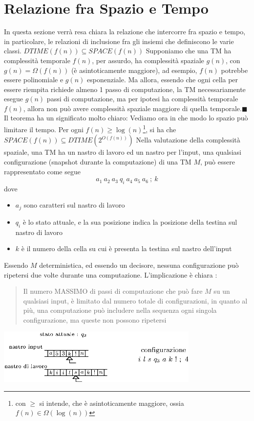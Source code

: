 \documentclass[10pt, letterpaper]{report}
\begin{document}
\section{Relazione fra Spazio e Tempo}
In questa sezione verrà resa chiara la relazione che intercorre fra spazio e tempo, in particolare, le relazioni di inclusione fra gli insiemi che definiscono le varie classi.  \acc 
\teo{} $DTIME(f(n))\subseteq SPACE(f(n))$\acc 
\dimo{} Supponiamo che una TM ha complessità temporale $f(n)$, per assurdo, ha complessità spaziale $g(n)$, con $g(n)=\Omega(f(n))$ (è asintoticamente maggiore), ad esempio, $f(n)$ potrebbe essere polinomiale e $g(n)$ esponenziale.  \acc 
Ma allora, essendo che ogni cella per essere riempita richiede almeno 1 passo di computazione, la TM necessariamente esegue $g(n)$ passi di computazione, ma per ipotesi ha complessità temporale $f(n)$, allora non può avere complessità spaziale maggiore di quella temporale.\hfill$\blacksquare$\acc   
Il  teorema ha un significato molto chiaro:
Vediamo ora in che modo lo spazio può limitare il tempo. \acc
\teo{} Per ogni $f(n)\ge \log(n)$\footnote{con $\ge$ si intende, che è asintoticamente maggiore, ossia $f(n)\in\Omega(\log(n))$}, si ha che $SPACE(f(n))\subseteq DTIME(2^{O(f(n))})$\acc 
\dimo{} Nella valutazione della complessità spaziale, una TM ha un nastro di lavoro ed un nastro per l'input, una qualsiasi configurazione (snapshot durante la computazione) di una TM $M$, può essere rappresentato come segue 
$$ a_1 \ a_2 \ a_3 \ q_i \ a_4 \ a_5 \ a_6 \ ;\ k$$
dove \begin{itemize}
    \item $a_j$ sono caratteri sul nastro di lavoro 
    \item $q_i$ è lo stato attuale, e la sua posizione indica la posizione della testina sul nastro di lavoro 
    \item $k$ è il numero della cella su cui è presenta la testina sul nastro dell'input
\end{itemize}
Essendo $M$ deterministica, ed essendo un decisore, nessuna configurazione può ripetersi due volte durante una computazione. L'implicazione è chiara :\begin{quote}
    Il numero MASSIMO di passi di computazione che può fare $M$ su un qualsiasi input, è limitato dal numero totale di configurazioni, in quanto al più, una computazione può includere nella sequenza ogni singola configurazione, ma queste non possono ripetersi
\end{quote}\begin{center}
    \includegraphics[width=0.75\textwidth ]{images/confTM2.eps}
\end{center}
\end{document}

